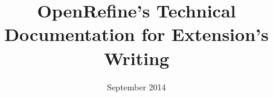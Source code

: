 \documentclass[11pt,a4paper]{article}
\begin{document}
\title{OpenRefine's Technical Documentation for Extension's Writing}
\date{September 2014}
	\maketitle
	\tableofcontents
	
\end{document}
